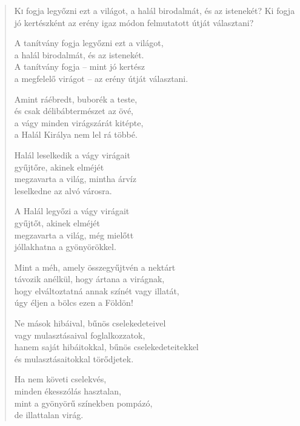 
\begin{verse}

{\par%
\lettrine[slope=0.5em]{K}{i} {\LettrineTextFont fogja legyőzni ezt a világot,}\newline
a halál birodalmát, és az istenekét?\newline
Ki fogja jó kertészként az erény\verselinebreak
igaz módon felmutatott útját választani?
\par}

 A tanítvány fogja legyőzni ezt a világot,\\
a halál birodalmát, és az istenekét.\\
A tanítvány fogja – mint jó kertész\\
a megfelelő virágot – az erény útját választani.

 Amint ráébredt, buborék a teste,\\
és csak délibábtermészet az övé,\\
a vágy minden virágszárát kitépte,\\
a Halál Királya nem lel rá többé.

 Halál leselkedik a vágy virágait\\
gyűjtőre, akinek elméjét\\
megzavarta a világ, mintha árvíz\\
leselkedne az alvó városra.

 A Halál legyőzi a vágy virágait\\
gyűjtőt, akinek elméjét\\
megzavarta a világ, még mielőtt\\
jóllakhatna a gyönyörökkel.

 Mint a méh, amely összegyűjtvén a nektárt\\
távozik anélkül, hogy ártana a virágnak,\\
hogy elváltoztatná annak színét vagy illatát,\\
úgy éljen a bölcs ezen a Földön!

 Ne mások hibáival, bűnös cselekedeteivel\\
vagy mulasztásaival foglalkozzatok,\\
hanem saját hibáitokkal, bűnös cselekedeteitekkel\\
és mulasztásaitokkal törődjetek.

 Ha nem követi cselekvés,\\
minden ékesszólás hasztalan,\\
mint a gyönyörű színekben pompázó,\\
de illattalan virág.


\end{verse}
